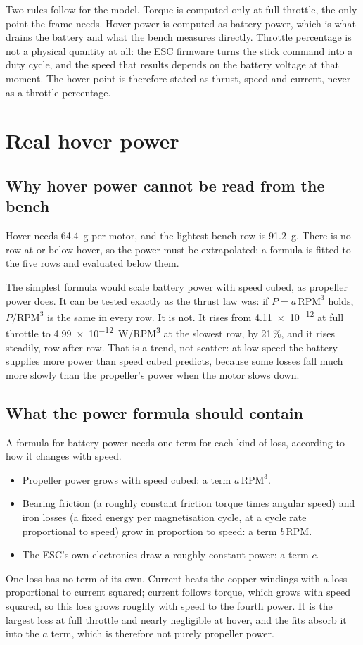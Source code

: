 Two rules follow for the model. Torque is computed only at full throttle, the only point the frame needs. Hover power is computed as battery power, which is what drains the battery and what the bench measures directly. Throttle percentage is not a physical quantity at all: the ESC firmware turns the stick command into a duty cycle, and the speed that results depends on the battery voltage at that moment. The hover point is therefore stated as thrust, speed and current, never as a throttle percentage.

\section{Real hover power}\label{sec:sizing-power}

\subsection{Why hover power cannot be read from the bench}

Hover needs \SI{64.4}{g} per motor, and the lightest bench row is \SI{91.2}{g}. There is no row at or below hover, so the power must be extrapolated: a formula is fitted to the five rows and evaluated below them.

The simplest formula would scale battery power with speed cubed, as propeller power does. It can be tested exactly as the thrust law was: if $P = a\,\text{RPM}^3$ holds, $P/\text{RPM}^3$ is the same in every row. It is not. It rises from \num{4.11e-12} at full throttle to \SI{4.99e-12}{W/RPM^3} at the slowest row, by 21\,\%, and it rises steadily, row after row. That is a trend, not scatter: at low speed the battery supplies more power than speed cubed predicts, because some losses fall much more slowly than the propeller's power when the motor slows down.

\subsection{What the power formula should contain}

A formula for battery power needs one term for each kind of loss, according to how it changes with speed.
\begin{itemize}
\item Propeller power grows with speed cubed: a term $a\,\text{RPM}^3$.
\item Bearing friction (a roughly constant friction torque times angular speed) and iron losses (a fixed energy per magnetisation cycle, at a cycle rate proportional to speed) grow in proportion to speed: a term $b\,\text{RPM}$.
\item The ESC's own electronics draw a roughly constant power: a term $c$.
\end{itemize}
One loss has no term of its own. Current heats the copper windings with a loss proportional to current squared; current follows torque, which grows with speed squared, so this loss grows roughly with speed to the fourth power. It is the largest loss at full throttle and nearly negligible at hover, and the fits absorb it into the $a$ term, which is therefore not purely propeller power.

